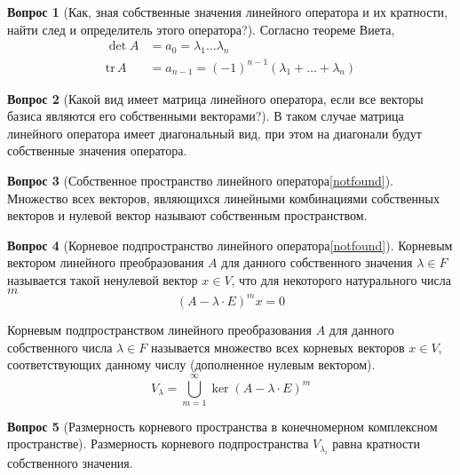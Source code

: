 \documentclass[a4paper,11pt]{article}
\theoremstyle{remark}
\theoremstyle{definition}
\newtheorem{question}{Вопрос}
\begin{document}
\begin{question}[Как, зная собственные значения линейного оператора и их кратности, найти след и определитель этого оператора?]
Согласно теореме Виета, 
\begin{align*}
	\det A &= a_0 = \lambda_1 \dots \lambda_n \\
	\mathrm{tr}\,A &= a_{n-1} = (-1)^{n-1} (\lambda_1 + \dots + \lambda_n)
\end{align*}
\end{question}


\begin{question}[Какой вид имеет матрица линейного оператора, если все векторы базиса являются его собственными векторами?]
В таком случае матрица линейного оператора имеет диагональный вид, при этом на диагонали будут собственные значения оператора.
\end{question}


\begin{question}[Собственное пространство линейного оператора\cref{notfound}]
Множество всех векторов, являющихся линейными комбинациями собственных векторов и нулевой вектор называют собственным пространством.
\end{question}


\begin{question}[Корневое подпространство линейного оператора\cref{notfound}]
Корневым вектором линейного преобразования \(A\) для данного собственного значения \(\lambda \in F\) называется такой ненулевой вектор \(x \in V\), что для некоторого натурального числа \(m\)
\begin{equation*}
 	(A - \lambda \cdot E)^mx = 0
\end{equation*} 

Корневым подпространством линейного преобразования \(A\) для данного собственного числа \(\lambda \in F\) называется множество всех корневых векторов \(x \in V\), соответствующих данному числу (дополненное нулевым вектором).
\begin{equation*}
	V_{\lambda} = \bigcup_{m = 1}^{\infty} \ker(A - \lambda \cdot E)^m
\end{equation*}
\end{question}


\begin{question}[Размерность корневого пространства в конечномерном комплексном пространстве]
Размерность корневого подпространства \(V_{\lambda_i}\) равна кратности собственного значения.
\end{question}
\end{document}
